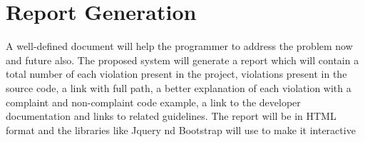 	\section{Report Generation}
	A well-defined document will help the programmer to address the problem now and future also. The proposed system will generate a report which will contain a total number of each violation present in the project, violations present in the source code, a link with full path, a better explanation of each violation with a complaint and non-complaint code example, a link to the developer documentation and links to related guidelines. The report will be in HTML format and the libraries like Jquery nd Bootstrap will use to make it interactive 
	
 
	 